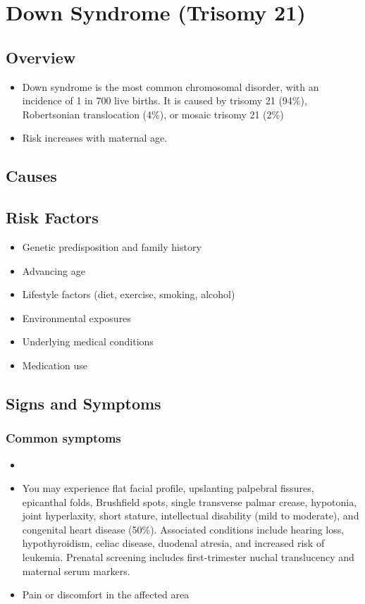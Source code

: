 \chapter{Down Syndrome (Trisomy 21)}
\label{sec:Down Syndrome}

\section{Overview}


\begin{itemize}[noitemsep]
  \item Down syndrome is the most common chromosomal disorder, with an incidence of 1 in 700 live births. It is caused by trisomy 21 (94\%), Robertsonian translocation (4\%), or mosaic trisomy 21 (2\%)
  \item Risk increases with maternal age.
\end{itemize}
\section{Causes}
\section{Risk Factors}

\begin{itemize}[noitemsep]
  \item Genetic predisposition and family history
  \item Advancing age
  \item Lifestyle factors (diet, exercise, smoking, alcohol)
  \item Environmental exposures
  \item Underlying medical conditions
  \item Medication use
\end{itemize}
\section{Signs and Symptoms}

\subsection{Common symptoms}
\begin{itemize}[noitemsep]
  \item \item You may experience flat facial profile, upslanting palpebral fissures, epicanthal folds, Brushfield spots, single transverse palmar crease, hypotonia, joint hyperlaxity, short stature, intellectual disability (mild to moderate), and congenital heart disease (50\%). Associated conditions include hearing loss, hypothyroidism, celiac disease, duodenal atresia, and increased risk of leukemia. Prenatal screening includes first-trimester nuchal translucency and maternal serum markers.

  \item Pain or discomfort in the affected area
  \end{itemize}

